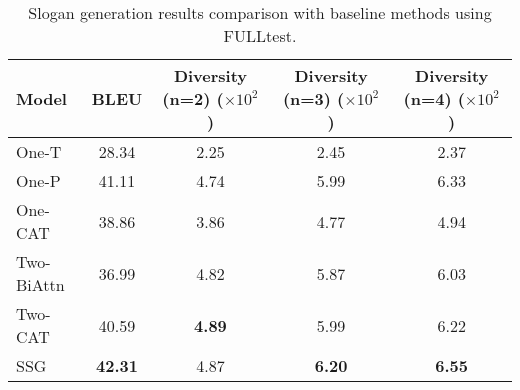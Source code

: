 \begin{table*}[th!]
	\centering
	\caption{Slogan generation results comparison with baseline methods using FULLtest.}
	\label{tab:auto_eval}
	\begin{tabular}{lcccc}
		\hline
		Model %
		& BLEU &  Diversity (n=2) ($\times 10^2$ )& Diversity (n=3) ($\times 10^2$ ) & Diversity (n=4) ($\times 10^2$ ) \\
		\hline
		One-T %
		&  28.34 &  2.25   &  2.45  &  2.37 \\
		One-P %
		&  41.11 &   4.74 &    5.99 & 6.33 \\
		One-CAT  %
		& 38.86  &  3.86 &  4.77  & 4.94 \\
		Two-BiAttn  %
		& 36.99  &  4.82 &  5.87  &  6.03   \\
		Two-CAT %
		& 40.59  &  \textbf{4.89} &  5.99  &  6.22 \\
		SSG %
		& \textbf{42.31}  & 4.87  &  \textbf{6.20} &  \textbf{6.55}  \\
		\hline 
	\end{tabular}
\end{table*}


